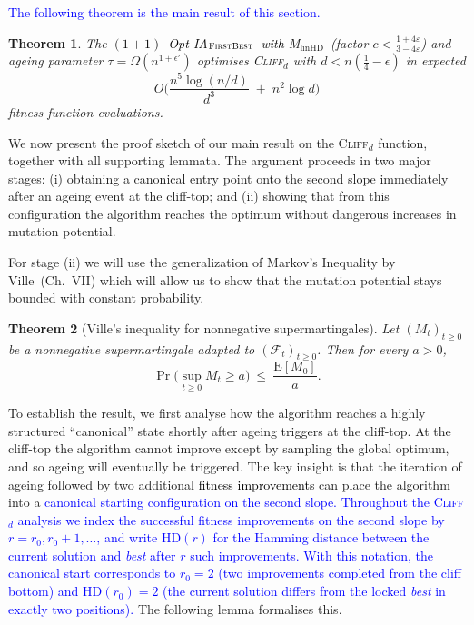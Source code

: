 \documentclass[lettersize,journal]{IEEEtran}
\newcommand{\rev}[1]{\textcolor{blue}{#1}}
\newcommand{\EE}{\text{E}}
\newcommand{\cliff}{\textsc{Cliff}$_d$}
\newcommand{\linHD}{M$_{\text{linHD}}$}
\newcommand{\firstBest}{$(1+1)$~Opt-IA$_{\textsc{FirstBest}}$}
\newtheorem{theorem}{Theorem}
\begin{document}
 
{
\rev{The following theorem is the main result of this section.}
\begin{theorem}\label{th:expoHD-cliff}
	The \textcolor{black}{\firstBest~with} \linHD\ (factor $c<\tfrac{1+4\varepsilon}{3-4\varepsilon}$) and ageing parameter $\tau=\Omega(n^{1+\epsilon'})$
	optimises \cliff{} with $d<n(\tfrac{1}{4}-\epsilon)$ in expected
	\[
	O\!\Big(\frac{n^{5}\log(n/d)}{d^{3}} \;+\; n^{2}\log d\Big)
	\]
	fitness function evaluations.
\end{theorem}


We now present the proof sketch of our main result on the  \cliff{} function, together with 
all supporting lemmata.  The argument proceeds in two 
major stages: (i) obtaining a canonical entry point onto the second slope 
immediately after an ageing event at the cliff-top; and (ii) showing that from 
this configuration the algorithm reaches the optimum without dangerous increases in mutation potential.

For stage (ii) we will use the generalization of Markov's Inequality by Ville~\cite{Doob1953}(Ch.~VII) which will allow us to show that the mutation potential stays bounded with constant probability.
\begin{theorem}[Ville's inequality for nonnegative supermartingales]\label{thm:ville}
	Let $(M_t)_{t\ge 0}$ be a nonnegative supermartingale adapted to $(\mathcal F_t)_{t\ge 0}$. 
	Then for every $a>0$,
	\[
	\Pr\!\big(\sup_{t\ge 0} M_t \ge a\big)\ \le\ \frac{\EE[M_0]}{a}.
	\]
\end{theorem}



To establish the result, we first analyse how the algorithm reaches a highly 
structured ``canonical'' state shortly after ageing triggers at the cliff-top.
At the cliff-top the algorithm cannot improve except by sampling the global 
optimum, and so ageing will eventually be triggered.  The key insight is that 
the iteration of ageing followed by two additional \textcolor{black}{fitness improvements} can place the 
algorithm into a
\textcolor{blue}{canonical
starting configuration on the second slope.
Throughout the \cliff{} analysis we index the successful fitness improvements on
the second slope by $r = r_0, r_0+1, \dots$, and write $\mathrm{HD}(r)$ for
the Hamming distance between the current solution and \emph{best} after $r$
such improvements.
With this notation, the canonical start corresponds to
$r_0 = 2$ (two improvements completed from the cliff bottom)
and $\mathrm{HD}(r_0) = 2$ (the current solution differs from the locked
\emph{best} in exactly two positions).}  The following lemma formalises this.

}
\end{document}
